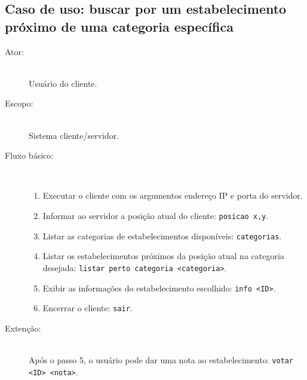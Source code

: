 \documentclass[a4paper,10pt,oneside,final,titlepage,onecolumn]{scrartcl}
\begin{document}
\subsection{Caso de uso: buscar por um estabelecimento próximo de uma categoria específica}
\begin{description}
 \item[Ator:] \hfill \\ Usuário do cliente.
 \item[Escopo:] \hfill \\ Sistema cliente/servidor.
 \item[Fluxo básico:] \hfill \\
 \begin{enumerate}
  \item Executar o cliente com os argumentos endereço IP e porta do servidor.
  \item Informar ao servidor a posição atual do cliente: \verb|posicao x,y|.
  \item Listar as categorias de estabelecimentos disponíveis: \verb|categorias|.
  \item Listar os estabelecimentos próximos da posição atual na categoria desejada: \verb|listar perto categoria <categoria>|.
  \item Exibir as informações do estabelecimento escolhido: \verb|info <ID>|.
  \item Encerrar o cliente: \verb|sair|.
 \end{enumerate}
 \item[Extenção:] \hfill \\ Após o passo 5, o usuário pode dar uma nota ao estabelecimento: \verb|votar <ID> <nota>|.
\end{description}
\end{document}
